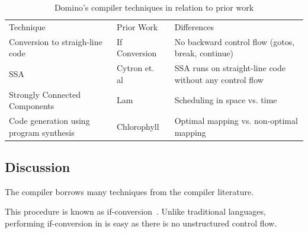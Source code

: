 \begin{table}[!t]
  \begin{scriptsize}
    \begin{tabular}{|p{}|p{}|p{}}
  \hline
  Technique & Prior Work & Differences \\
  Conversion to straigh-line code & If Conversion~\cite{if_conversion} & No backward control flow (gotos, break, continue) \\
  SSA & Cytron et. al~\cite{ssa} & SSA runs on straight-line code without any control flow \\
  Strongly Connected Components & Lam~\cite{lam} & Scheduling in space vs. time \\
  Code generation using program synthesis & Chlorophyll~\cite{chlorophyll} & Optimal mapping vs. non-optimal mapping \\
  \end{tabular}
  \end{scriptsize}
  \caption{Domino's compiler techniques in relation to prior work}
  \label{tab:prior_compiler}
\end{table}

\subsection{Discussion}
The \pktlanguage compiler borrows many techniques from the compiler literature.

This procedure is known as
if-conversion~\cite{if_conversion}. Unlike traditional languages, performing
if-conversion in \pktlanguage is easy as there is no unstructured control
flow.  
